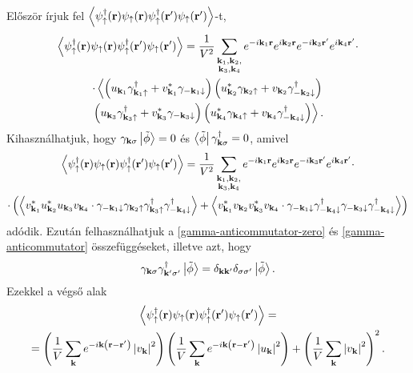 \documentclass[a4paper,12pt,titlepage]{article}
\newcommand{\KK}{{\vb{k}}}
\newcommand{\RR}{{\vb{r}}}
\begin{document}
Először írjuk fel $\left< \psi_\uparrow^\dagger(\RR) \psi_\uparrow(\RR) \psi_\uparrow^\dagger(\RR^\prime) \psi_\uparrow(\RR^\prime) \right>$-t,
\begin{multline}
	\left< \psi_\uparrow^\dagger(\RR) \psi_\uparrow(\RR) \psi_\uparrow^\dagger(\RR^\prime) \psi_\uparrow(\RR^\prime) \right> = \frac{1}{V^2} \sum\limits_{\substack{\KK_1, \KK_2, \\ \KK_3, \KK_4}} e^{-i \KK_1 \RR} e^{i \KK_2 \RR} e^{-i \KK_3 \RR^\prime} e^{i \KK_4 \RR^\prime} \cdot \\
	\cdot \left< \left( u_{\KK_1} \gamma_{\KK_1 \uparrow}^\dagger + v_{\KK_1}^* \gamma_{-\KK_1 \downarrow} \right) \left( u_{\KK_2}^* \gamma_{\KK_2 \uparrow} + v_{\KK_2} \gamma_{-\KK_2 \downarrow}^\dagger \right)
	\right. \\ \left.
	\left( u_{\KK_3} \gamma_{\KK_3 \uparrow}^\dagger + v_{\KK_3}^* \gamma_{-\KK_3 \downarrow} \right) \left( u_{\KK_4}^* \gamma_{\KK_4 \uparrow} + v_{\KK_4} \gamma_{-\KK_4 \downarrow}^\dagger \right) \right>.
\end{multline}
Kihasználhatjuk, hogy $\gamma_{\KK \sigma} \ket{\tilde{\phi}} = 0$ és $\bra{\tilde{\phi}} \gamma_{\KK \sigma}^\dagger = 0$, amivel
\begin{multline}
	\left< \psi_\uparrow^\dagger(\RR) \psi_\uparrow(\RR) \psi_\uparrow^\dagger(\RR^\prime) \psi_\uparrow(\RR^\prime) \right> = \frac{1}{V^2} \sum\limits_{\substack{\KK_1, \KK_2, \\ \KK_3, \KK_4}} e^{-i \KK_1 \RR} e^{i \KK_2 \RR} e^{-i \KK_3 \RR^\prime} e^{i \KK_4 \RR^\prime} \cdot \\
	\cdot \left( \left< v_{\KK_1}^* u_{\KK_2}^* u_{\KK_3} v_{\KK_4} \cdot \gamma_{-\KK_1 \downarrow} \gamma_{\KK_2 \uparrow} \gamma_{\KK_3 \uparrow}^\dagger \gamma_{-\KK_4 \downarrow}^\dagger \right> + \left< v_{\KK_1}^* v_{\KK_2} v_{\KK_3}^* v_{\KK_4} \cdot \gamma_{-\KK_1 \downarrow} \gamma_{-\KK_4 \downarrow}^\dagger \gamma_{-\KK_3 \downarrow} \gamma_{-\KK_4 \downarrow}^\dagger \right> \right)
\end{multline}
adódik.  Ezután felhasználhatjuk a \eqref{gamma-anticommutator-zero} és \eqref{gamma-anticommutator} összefüggéseket, illetve azt, hogy
$$ \gamma_{\KK \sigma} \gamma_{\KK^\prime \sigma^\prime}^\dagger \ket{\tilde{\phi}} = \delta_{\KK \KK^\prime} \delta_{\sigma \sigma^\prime} \ket{\tilde{\phi}}. $$
Ezekkel a végső alak
\begin{multline}
	\left< \psi_\uparrow^\dagger(\RR) \psi_\uparrow(\RR) \psi_\uparrow^\dagger(\RR^\prime) \psi_\uparrow(\RR^\prime) \right> = \\
	= \left( \frac{1}{V} \sum\limits_\KK e^{-i \KK \left( \RR - \RR^\prime \right)} \left| v_\KK \right|^2 \right) \left( \frac{1}{V} \sum\limits_\KK e^{-i \KK \left( \RR - \RR^\prime \right)} \left| u_\KK \right|^2 \right) + \left( \frac{1}{V} \sum\limits_\KK \left| v_\KK \right|^2 \right)^2.
\end{multline}
\end{document}
